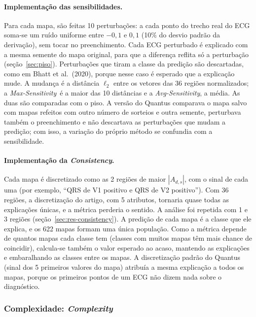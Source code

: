 \documentclass[11pt,a4paper]{article}
\newcommand{\MS}{\textit{Max-Sensitivity}}
\newcommand{\AS}{\textit{Avg-Sensitivity}}
\newcommand{\CX}{\textit{Complexity}}
\newcommand{\CS}{\textit{Consistency}}
\begin{document}
\paragraph{Implementação das sensibilidades.} Para cada mapa, são feitas 10 perturbações: a cada ponto do trecho real do ECG soma-se um ruído uniforme entre $-0{,}1$ e $0{,}1$ (10\% do desvio padrão da derivação), sem tocar no preenchimento. Cada ECG perturbado é explicado com a mesma semente do mapa original, para que a diferença reflita só a perturbação (seção~\ref{sec:piso}). Perturbações que tiram a classe da predição são descartadas, como em Bhatt et al.\ (2020), porque nesse caso é esperado que a explicação mude. A mudança é a distância $\ell_2$ entre os vetores das 36 regiões normalizados; a \MS\ é a maior das 10 distâncias e a \AS, a média. As duas são comparadas com o piso. A versão do Quantus comparava o mapa salvo com mapas refeitos com outro número de sorteios e outra semente, perturbava também o preenchimento e não descartava as perturbações que mudam a predição; com isso, a variação do próprio método se confundia com a sensibilidade.

\paragraph{Implementação da \CS.} Cada mapa é discretizado como as 2 regiões de maior $|A_{d,s}|$, com o sinal de cada uma (por exemplo, ``QRS de V1 positivo e QRS de V2 positivo''). Com 36 regiões, a discretização do artigo, com 5 atributos, tornaria quase todas as explicações únicas, e a métrica perderia o sentido. A análise foi repetida com 1 e 3 regiões (seção~\ref{sec:res-consistency}). A predição de cada mapa é a classe que ele explica, e os 622 mapas formam uma única população. Como a métrica depende de quantos mapas cada classe tem (classes com muitos mapas têm mais chance de coincidir), calcula-se também o valor esperado ao acaso, mantendo as explicações e embaralhando as classes entre os mapas. A discretização padrão do Quantus (sinal dos 5 primeiros valores do mapa) atribuía a mesma explicação a todos os mapas, porque os primeiros pontos de um ECG não dizem nada sobre o diagnóstico.

\subsubsection{Complexidade: \CX}
\end{document}
